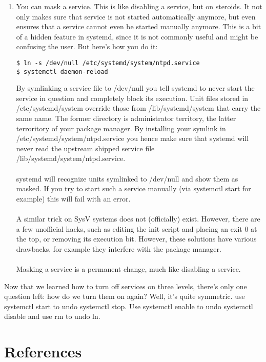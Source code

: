 \documentclass[titlepage]{article}
\begin{document}
\begin{enumerate}
\begin{lstlisting}
$ systemctl disable ntpd.service
$ systemctl stop ntpd.service
\end{lstlisting}
Commands like this are for example used during package deinstallation of systemd services on Fedora.
\\
\\
Disabling a service is a permanent change; until you undo it it will be kept, even across reboots.
\item
You can mask a service. This is like disabling a service, but on steroids. It not only makes sure that service is not started automatically anymore, but even ensures that a service cannot even be started manually anymore. This is a bit of a hidden feature in systemd, since it is not commonly useful and might be confusing the user. But here's how you do it:
\begin{lstlisting}
$ ln -s /dev/null /etc/systemd/system/ntpd.service
$ systemctl daemon-reload
\end{lstlisting}
By symlinking a service file to /dev/null you tell systemd to never start the service in question and completely block its execution. Unit files stored in /etc/systemd/system override those from /lib/systemd/system that carry the same name. The former directory is administrator territory, the latter terroritory of your package manager. By installing your symlink in /etc/systemd/system/ntpd.service you hence make sure that systemd will never read the upstream shipped service file /lib/systemd/system/ntpd.service.
\\
\\
systemd will recognize units symlinked to /dev/null and show them as masked. If you try to start such a service manually (via systemctl start for example) this will fail with an error.
\\
\\
A similar trick on SysV systems does not (officially) exist. However, there are a few unofficial hacks, such as editing the init script and placing an exit 0 at the top, or removing its execution bit. However, these solutions have various drawbacks, for example they interfere with the package manager.
\\
\\
Masking a service is a permanent change, much like disabling a service.
\end{enumerate}
Now that we learned how to turn off services on three levels, there's only one question left: how do we turn them on again? Well, it's quite symmetric. use systemctl start to undo systemctl stop. Use systemctl enable to undo systemctl disable and use rm to undo ln.
\section{References}
\nocite{*}


\end{document}
